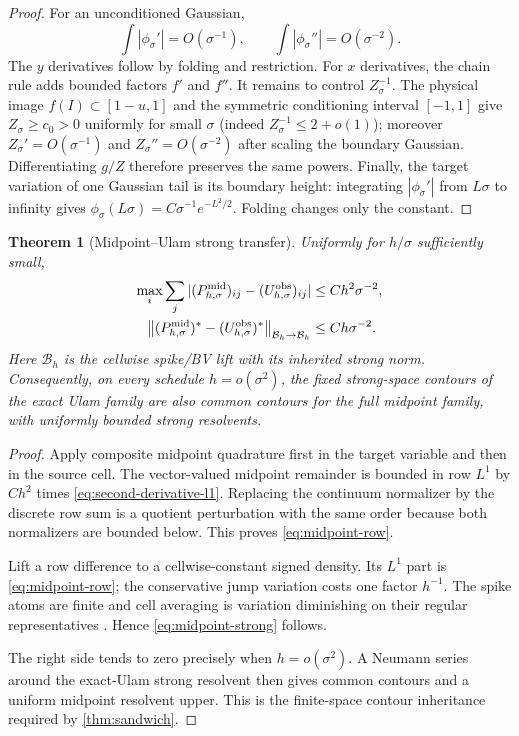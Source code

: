 \documentclass[11pt]{article}
\newtheorem{theorem}{Theorem}[section]
\theoremstyle{remark}
\newcommand{\cB}{\mathcal B}
\newcommand{\norm}[1]{\left\lVert #1\right\rVert}
\begin{document}
\begin{proof}
For an unconditioned Gaussian,
\[
 \int|\phi_\sigma'|=O(\sigma^{-1}),
 \qquad
 \int|\phi_\sigma''|=O(\sigma^{-2}).
\]
The $y$ derivatives follow by folding and restriction.  For $x$ derivatives,
the chain rule adds bounded factors $f'$ and $f''$.  It remains to control
$Z_\sigma^{-1}$.  The physical image $f(I)\subset[1-u,1]$ and the symmetric
conditioning interval $[-1,1]$ give $Z_\sigma\ge c_0>0$ uniformly for small
$\sigma$ (indeed $Z_\sigma^{-1}\le2+o(1)$); moreover
$Z_\sigma' =O(\sigma^{-1})$ and $Z_\sigma''=O(\sigma^{-2})$ after scaling
the boundary Gaussian.  Differentiating $g/Z$ therefore preserves the same
powers.  Finally, the target variation of one Gaussian tail is its boundary
height: integrating $|\phi_\sigma'|$ from $L\sigma$ to infinity gives
$\phi_\sigma(L\sigma)=C\sigma^{-1}e^{-L^2/2}$.  Folding changes only the
constant.
\end{proof}

\begin{theorem}[Midpoint--Ulam strong transfer]
\label{thm:midpoint-ulam}
Uniformly for $h/\sigma$ sufficiently small,
\begin{align}
 \max_i\sum_j
 |(P^{\rm mid}_{h,\sigma})_{ij}
  -(U^{\rm obs}_{h,\sigma})_{ij}|
 &\le Ch^2\sigma^{-2},
 \label{eq:midpoint-row}\\
 \norm{(P^{\rm mid}_{h,\sigma})^*-(U^{\rm obs}_{h,\sigma})^*}_{\cB_h\to\cB_h}
 &\le Ch\sigma^{-2}.
 \label{eq:midpoint-strong}
\end{align}
Here $\cB_h$ is the cellwise spike/BV lift with its inherited strong norm.
Consequently, on every schedule $h=o(\sigma^2)$, the fixed strong-space
contours of the exact Ulam family are also common contours for the full
midpoint family, with uniformly bounded strong resolvents.
\end{theorem}

\begin{proof}
Apply composite midpoint quadrature first in the target variable and then
in the source cell.  The vector-valued midpoint remainder is bounded in
row $L^1$ by $Ch^2$ times
\eqref{eq:second-derivative-l1}.  Replacing the continuum normalizer by the
discrete row sum is a quotient perturbation with the same order because both
normalizers are bounded below.  This proves \eqref{eq:midpoint-row}.

Lift a row difference to a cellwise-constant signed density.  Its $L^1$
part is \eqref{eq:midpoint-row}; the conservative jump variation costs one
factor $h^{-1}$.  The spike atoms are finite and cell averaging is
variation diminishing on their regular representatives
\citep{Li1976,BoyarskyGora1997}.  Hence
\eqref{eq:midpoint-strong} follows.

The right side tends to zero precisely when $h=o(\sigma^2)$.  A Neumann
series around the exact-Ulam strong resolvent then gives common contours and
a uniform midpoint resolvent upper.  This is the finite-space contour
inheritance required by \cref{thm:sandwich}.
\end{proof}
\end{document}
